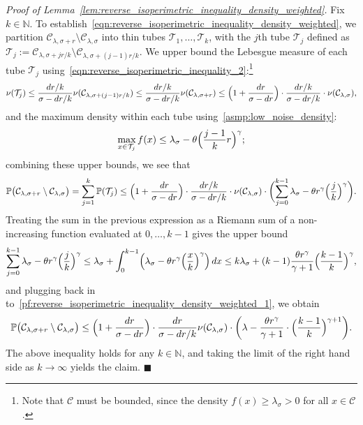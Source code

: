 \documentclass[twoside,11pt]{article}
\newcommand{\1}{\mathbf{1}}
\newcommand{\mc}[1]{\mathcal{#1}}
\newcommand{\Pbb}{\mathbb{P}}
\newcommand{\qed}{\hfill $\blacksquare$}
\begin{document}
\noindent \emph{Proof of Lemma~\ref{lem:reverse_isoperimetric_inequality_density_weighted}.}
Fix $k \in \mathbb{N}$. To establish~\eqref{eqn:reverse_isoperimetric_inequality_density_weighted}, we partition $\mc{C}_{\lambda,\sigma + r} \setminus \mc{C}_{\lambda,\sigma}$ into thin tubes $\mc{T}_{1},\ldots,\mc{T}_{k}$, with the $j$th tube $\mc{T}_j$ defined as $\mc{T}_j := \mc{C}_{\lambda,\sigma + jr/k} \setminus \mc{C}_{\lambda,\sigma + (j - 1)r/k}.$ We upper bound the Lebesgue measure of each tube $\mc{T}_j$ using~\eqref{eqn:reverse_isoperimetric_inequality_2}:\footnote{Note that $\mc{C}$ must be bounded, since the density $f(x) \geq \lambda_{\sigma} > 0$ for all $x \in \mc{C}$.}
\begin{equation*}
\nu(\mc{T}_j) \leq \frac{dr/k}{\sigma - dr/k} \nu(\mc{C}_{\lambda,\sigma + (j - 1)r/k}) \leq \frac{dr/k}{\sigma - dr/k} \nu(\mc{C}_{\lambda,\sigma + r}) \leq \Bigl(1 + \frac{dr}{\sigma - dr}\Bigr) \cdot \frac{dr/k}{\sigma - dr/k}  \cdot \nu(\mc{C}_{\lambda,\sigma}),
\end{equation*}
and the maximum density within each tube using~\ref{asmp:low_noise_density}:
\begin{equation*}
\max_{x \in \mc{T}_j} f(x) \leq \lambda_{\sigma} - \theta \Bigl(\frac{j - 1}{k}r\Bigr)^{\gamma};
\end{equation*}
combining these upper bounds, we see that
\begin{equation}
\label{pf:reverse_isoperimetric_inequality_density_weighted_1}
\Pbb\bigl(\mc{C}_{\lambda,\sigma + r} \setminus \mc{C}_{\lambda,\sigma}\bigr) = \sum_{j = 1}^{k} \Pbb(\mc{T}_j) \leq \Bigl(1 + \frac{dr}{\sigma - dr}\Bigr) \cdot  \frac{dr/k}{\sigma - dr/k} \cdot \nu(\mc{C}_{\lambda,\sigma}) \cdot \biggl(\sum_{j = 0}^{k - 1}\lambda_{\sigma} -  \theta r^{\gamma} \Bigl(\frac{j}{k}\Bigr)^{\gamma} \biggr).
\end{equation}
Treating the sum in the previous expression as a Riemann sum of a non-increasing function evaluated at $0,\ldots,k -1$ gives the upper bound
\begin{equation*}
\sum_{j = 0}^{k - 1}\lambda_{\sigma} -  \theta r^{\gamma} \Bigl(\frac{j}{k}\Bigr)^{\gamma } \leq \lambda_{\sigma} + \int_{0}^{k - 1} \Bigl(\lambda_{\sigma} -  \theta r^{\gamma} \Bigl(\frac{x}{k}\Bigr)^{\gamma}\Bigr) \,dx \leq k\lambda_{\sigma} + (k - 1)\frac{\theta r^{\gamma}}{\gamma + 1} \Bigl(\frac{k - 1}{k}\Bigr)^{\gamma},
\end{equation*}
and plugging back in to~\eqref{pf:reverse_isoperimetric_inequality_density_weighted_1}, we obtain
\begin{equation*}
\Pbb\bigl(\mc{C}_{\lambda,\sigma + r} \setminus \mc{C}_{\lambda,\sigma}\bigr) \leq  \Bigl(1 + \frac{dr}{\sigma - dr}\Bigr) \cdot \frac{dr}{\sigma - dr/k} \nu(\mc{C}_{\lambda,\sigma}) \cdot \biggl(\lambda - \frac{\theta r^{\gamma}}{\gamma + 1} \cdot \Bigl(\frac{k - 1}{k}\Bigr)^{\gamma + 1} \biggl).
\end{equation*}
The above inequality holds for any $k \in \mathbb{N}$, and taking the limit of the right hand side as $k \to \infty$ yields the claim. \qed
\end{document}

